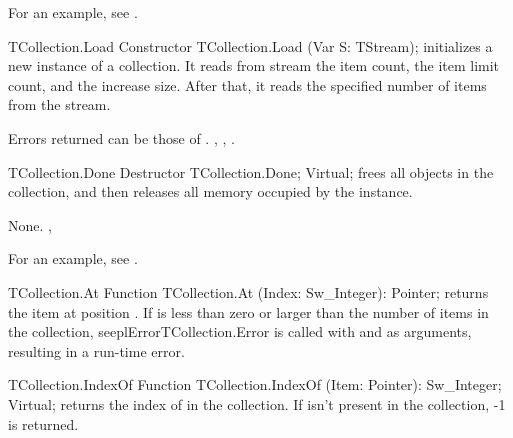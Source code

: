 For an example, see .

\begin{procedure}{TCollection.Load}
\Declaration
Constructor TCollection.Load (Var S: TStream);
\Description
{} initializes a new instance of a collection. It reads from stream
 the item count, the item limit count, and the increase size. After
that, it reads the specified number of items from the stream. 

\Errors
Errors returned can be those of .
\SeeAlso
{}, ,
.
\end{procedure}

\html{}

\begin{procedure}{TCollection.Done}
\Declaration
Destructor TCollection.Done; Virtual;
\Description
{} frees all objects in the collection, and then releases all memory
occupied by the instance.

\Errors
None.
\SeeAlso
{}, 
\end{procedure}

For an example, see .

\begin{function}{TCollection.At}
\Declaration
Function TCollection.At (Index: Sw\_Integer): Pointer;
\Description
{} returns the item at position .
\Errors
If  is less than zero or larger than the number of items
in the collection, seepl{Error}{TCollection.Error} is called with
 and  as arguments, resulting in a run-time
error.
\SeeAlso
{}
\end{function}

\html{}

\begin{function}{TCollection.IndexOf}
\Declaration
Function TCollection.IndexOf (Item: Pointer): Sw\_Integer; Virtual;
\Description
{} returns the index of  in the collection. 
If  isn't present in the collection, -1 is returned.
\Errors
\SeeAlso
\end{function}

